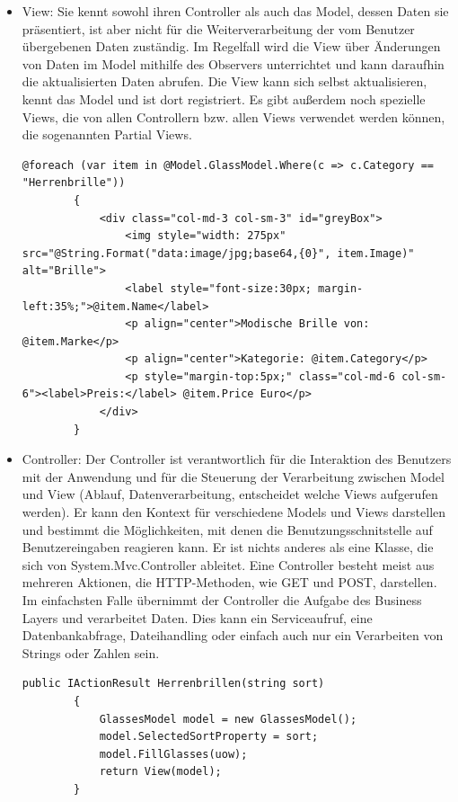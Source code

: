 \begin{itemize}
\item View: Sie kennt sowohl ihren Controller als auch das Model, dessen Daten sie präsentiert, ist aber nicht für die Weiterverarbeitung der vom Benutzer übergebenen Daten zuständig. Im Regelfall wird die View über Änderungen von Daten im Model mithilfe des Observers unterrichtet und kann daraufhin die aktualisierten Daten abrufen. Die View kann sich selbst aktualisieren, kennt das Model und ist dort registriert.
Es gibt außerdem noch spezielle Views, die von allen Controllern bzw. allen Views verwendet werden können, die sogenannten Partial Views.
\begin{lstlisting}
@foreach (var item in @Model.GlassModel.Where(c => c.Category == "Herrenbrille"))
        {
            <div class="col-md-3 col-sm-3" id="greyBox">
                <img style="width: 275px" src="@String.Format("data:image/jpg;base64,{0}", item.Image)" alt="Brille">
                <label style="font-size:30px; margin-left:35%;">@item.Name</label>
                <p align="center">Modische Brille von: @item.Marke</p>
                <p align="center">Kategorie: @item.Category</p>
                <p style="margin-top:5px;" class="col-md-6 col-sm-6"><label>Preis:</label> @item.Price Euro</p>
            </div>
        }
\end{lstlisting}

\item Controller: Der Controller ist verantwortlich für die Interaktion des Benutzers mit der Anwendung und für die Steuerung der Verarbeitung zwischen Model und View (Ablauf, Datenverarbeitung, entscheidet welche Views aufgerufen werden).
Er kann den Kontext für verschiedene Models und Views darstellen und bestimmt die Möglichkeiten, mit denen die Benutzungsschnitstelle auf Benutzereingaben reagieren kann.
Er ist nichts anderes als eine Klasse, die sich von System.Mvc.Controller ableitet. 
Eine Controller besteht meist aus mehreren Aktionen, die HTTP-Methoden, wie GET und POST, darstellen. Im einfachsten Falle übernimmt der Controller die Aufgabe des Business Layers und verarbeitet Daten. Dies kann ein Serviceaufruf, eine Datenbankabfrage, Dateihandling oder einfach auch nur ein Verarbeiten von Strings oder Zahlen sein.
\begin{lstlisting}
public IActionResult Herrenbrillen(string sort)
        {
            GlassesModel model = new GlassesModel();
            model.SelectedSortProperty = sort;
            model.FillGlasses(uow);
            return View(model);
        }
\end{lstlisting}
\end{itemize}
